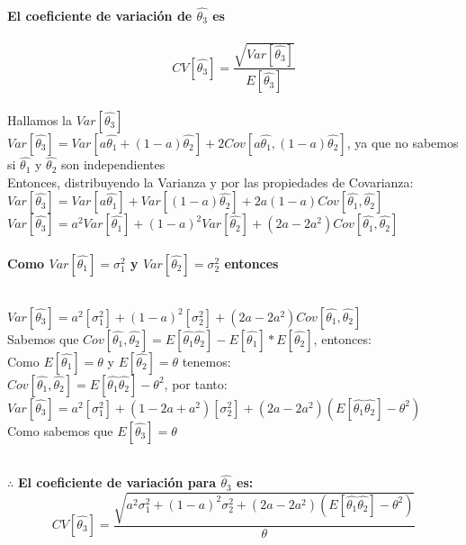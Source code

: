 \documentclass[letterpaper,12pt,onecolumn,titlepage]{article}
\begin{document}
~\\\textbf{ El coeficiente de variaci\'{o}n de $\hat{\theta_3}$ es}
~\\
~\\ $$CV[\hat{\theta_3}]=\frac{\sqrt{Var[\hat{\theta_3}]}}{E[\hat{\theta_3}]}$$
~\\ Hallamos la $Var[\hat{\theta_3}]$
~\\ $Var[\hat{\theta_3}]=Var[a{\hat{\theta_1}}+(1-a){\hat{\theta_2}}]+2Cov[a{\hat{\theta_1}},(1-a){\hat{\theta_2}}]$,    ya que no sabemos si ${\hat{\theta_1}}$ y ${\hat{\theta_2}}$ son independientes
~\\ Entonces, distribuyendo la Varianza y por las propiedades de Covarianza:
~\\ $Var[\hat{\theta_3}]=Var[a{\hat{\theta_1}}]+Var[(1-a){\hat{\theta_2}}]+2a(1-a) Cov[{\hat{\theta_1}},{\hat{\theta_2}}]$
~\\ $Var[\hat{\theta_3}]=a^2Var[{\hat{\theta_1}}]+(1-a)^2Var[{\hat{\theta_2}}]+(2a-2a^2)Cov[{\hat{\theta_1}},{\hat{\theta_2}}]$
~\\
~\\\textbf{Como $Var[{\hat{\theta_1}}]=\sigma_1^2$ y $Var[{\hat{\theta_2}}]=\sigma_2^2$ entonces}

~\\ $Var[\hat{\theta_3}]=a^2[\sigma_1^2]+(1-a)^2[\sigma_2^2]+(2a-2a^2)Cov[{\hat{\theta_1}},{\hat{\theta_2}}]$
~\\ Sabemos que $Cov[{\hat{\theta_1}},{\hat{\theta_2}}]= E[{\hat{\theta_1}}{\hat{\theta_2}}]- E[{\hat{\theta_1}}]*E[{\hat{\theta_2}}]$, entonces:
~\\ Como $E[{\hat{\theta_1}}]={\theta}$ y $E[{\hat{\theta_2}}]={\theta}$ tenemos:
~\\ $Cov[{\hat{\theta_1}},{\hat{\theta_2}}]=E[{\hat{\theta_1}}{\hat{\theta_2}}]-{\theta^2}$, por tanto:
~\\ $Var[\hat{\theta_3}]=a^2[\sigma_1^2]+(1-2a+a^2)[\sigma_2^2]+(2a-2a^2)(E[{\hat{\theta_1}}{\hat{\theta_2}}]-{\theta^2})$
~\\ Como sabemos que $E[\hat{\theta_3}]={\theta}$

~\\$\therefore$ \textbf{El coeficiente de variaci\'{o}n para $\hat{\theta_3}$ es:}  
$$CV[\hat{\theta_3}]=\frac{\sqrt{a^2\sigma_1^2+(1-a)^2\sigma_2^2+(2a-2a^2)(E[{\hat{\theta_1}}{\hat{\theta_2}}]-{\theta^2})}}{{\theta}}$$
\end{document}
